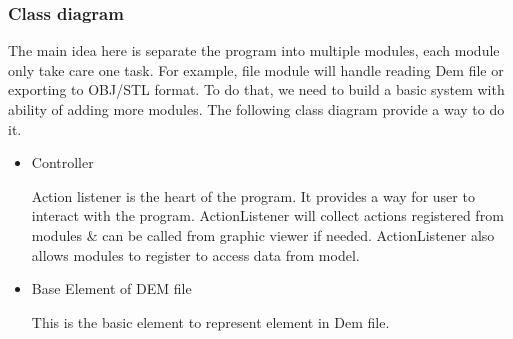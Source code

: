 \documentclass[11pt]{article}
\begin{document}
\subsubsection{Class diagram}
The main idea here is separate the program into multiple modules, each module only take care one task. For example, file module will handle reading Dem file or exporting to OBJ/STL format. To do that, we need to build a basic system with ability of adding more modules. The following class diagram provide a way to do it.
\begin{itemize}

\item Controller
\par\noindent{}
Action listener is the heart of the program. It provides a way for user to interact with the program. ActionListener will collect actions registered from modules \& can be called from graphic viewer if needed. ActionListener also allows modules to register to access data from model.

\item Base Element of DEM file
\par\noindent{}
This is the basic element to represent element in Dem file.


\end{itemize}
\end{document}
